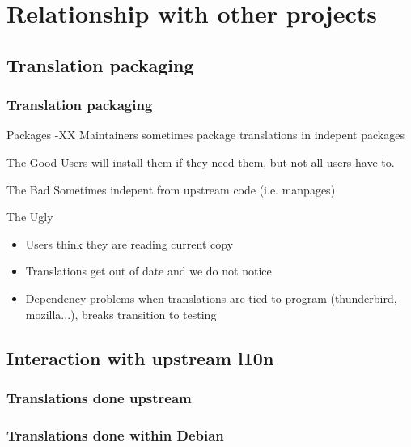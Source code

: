 \documentclass{beamer}
\begin{document}
\section{Relationship with other projects}

\subsection{Translation packaging}

\begin{frame}
  \frametitle{Translation packaging}
	\begin{block}
		{Packages -XX}
		Maintainers sometimes package translations in indepent packages
	\end{block}
	\begin{block}
		{The Good}
		Users will install them if they need them, but not all users have to.
	\end{block}
	\begin{block}
		{The Bad}
		Sometimes indepent from upstream code (i.e. manpages)
	\end{block}
	\begin{block}
		{The Ugly}
		\begin{itemize}
		\item Users think they are reading current copy
		\item Translations get out of date and we do not notice
		\item Dependency problems when translations are tied to program (thunderbird, mozilla...), breaks transition to testing
		\end{itemize}
	\end{block}
\end{frame}

\subsection{Interaction with upstream l10n}

\begin{frame}
  \frametitle{Translations done upstream}
\end{frame}

\begin{frame}
  \frametitle{Translations done within Debian}
\end{frame}
\end{document}
